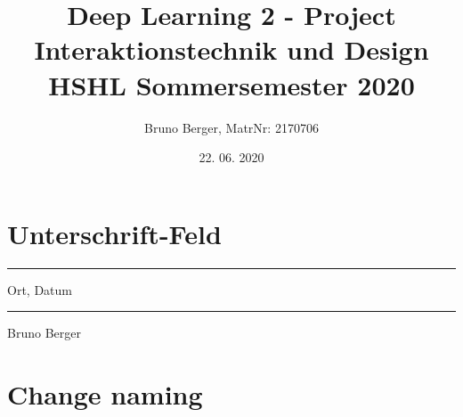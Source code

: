 \title{Deep Learning 2 - Project\\
    \vspace{+14pt}
        \Large Interaktionstechnik und Design \\
        HSHL  Sommersemester 2020}
\author{Bruno Berger, MatrNr: 2170706}
\date{22. 06. 2020}


\section{Unterschrift-Feld}
\vfill
\parbox{5cm}{
\hrule
\strut Ort, Datum}
\hfill\parbox{6cm}
{\hrule \strut Bruno Berger}

\section{Change naming}
\renewcommand{\abstractname}{Vorwort}

\printbibliography[title = {Literature}]
